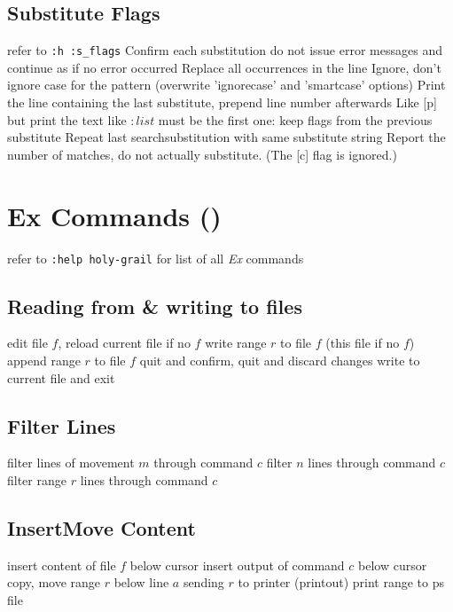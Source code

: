 \subsection{Substitute Flags}	{refer to {\tt :h :s\_flags}}
	{Confirm each substitution}
	{ do not issue error messages and continue as if no error occurred}
	{Replace all occurrences in the line}
	{Ignore, don't ignore case for the pattern (overwrite 'ignorecase' and 'smartcase' options)}
	{Print the line containing the last substitute, prepend line number afterwards}
	{Like [p] but print the text like $:list$}
\cmdOper{\&}	{must be the first one: keep flags from the previous substitute}
	{Repeat last search\or substitution with same substitute string}
	{Report the number of matches, do not actually substitute.  (The [c] flag is ignored.) }

\vskip -0.2cm
\section{Ex Commands (\enter)}	{refer to {\tt :help holy-grail} for list of all {\it Ex\/} commands}
\subsection{Reading from \& writing to files}	{}
	{edit file $f$, reload current file if no $f$}
	{write range $r$ to file $f$ (this file if no $f$)}
	{append range $r$ to file $f$}
	{quit and confirm, quit and discard changes}
	{write to current file and exit}

\subsection{Filter Lines}{}
	{filter lines of movement $m$ through command $c$}
	{filter $n$ lines through command $c$}
	{filter range $r$ lines through command $c$}

\subsection{Insert\or Move Content}	{}
	{insert content of file $f$ below cursor}
	{insert output of command $c$ below cursor}
	{copy, move range $r$ below line $a$}
	{sending $r$ to printer (printout)}
	{print range to ps file}

